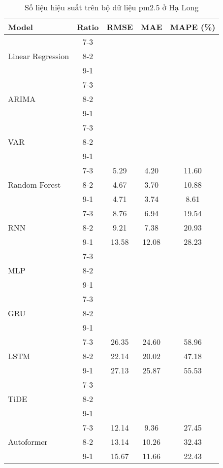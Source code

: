 \begin{table}[h!]
    \centering
    \caption{Số liệu hiệu suất trên bộ dữ liệu pm2.5 ở Hạ Long}
    \begin{tabular}{|l|c|c|c|c|}
    \hline
    \rowcolor{orange!30} \textbf{Model} & \textbf{Ratio} & \textbf{RMSE} & \textbf{MAE} & \textbf{MAPE (\%)} \\ \hline
    \rowcolor{white} & 7-3 &  &  &  \\ 
    \rowcolor{white} Linear Regression & 8-2 &  &  &  \\ 
    \rowcolor{white} & 9-1 &  &  &  \\ \hline
    \rowcolor{white} & 7-3 &  &  &  \\ 
    \rowcolor{white} ARIMA & 8-2 &  &  &  \\ 
    \rowcolor{white} & 9-1 &  &  &  \\ \hline
    \rowcolor{white} & 7-3 &  &  &  \\ 
    \rowcolor{white} VAR & 8-2 &  &  &  \\ 
    \rowcolor{white} & 9-1 &  &  & \\ \hline
    \rowcolor{white} & 7-3 & 5.29 & 4.20 & 11.60 \\ 
    \rowcolor{white} Random Forest & 8-2 & 4.67 & 3.70 & 10.88 \\ 
    \rowcolor{white} & 9-1 & 4.71 & 3.74 & 8.61 \\ \hline
    \rowcolor{white}  & 7-3 & 8.76 & 6.94 & 19.54 \\ 
    \rowcolor{white} RNN & 8-2 & 9.21 & 7.38 & 20.93 \\ 
    \rowcolor{white}  & 9-1 & 13.58 & 12.08 & 28.23 \\ \hline
    \rowcolor{white} & 7-3 &  &  &  \\ 
    \rowcolor{white} MLP & 8-2 &  &  &  \\ 
    \rowcolor{white} & 9-1 &  &  &  \\ \hline
    \rowcolor{white} & 7-3 &  &  &  \\ 
    \rowcolor{white} GRU & 8-2 &  &  &  \\ 
    \rowcolor{white} & 9-1 &  &  &  \\ \hline
    \rowcolor{white}  & 7-3 & 26.35 & 24.60 & 58.96 \\ 
    \rowcolor{white} LSTM & 8-2 & 22.14 & 20.02 & 47.18 \\ 
    \rowcolor{white}  & 9-1 & 27.13 & 25.87 & 55.53 \\ \hline
    \rowcolor{white!30} & 7-3 &  &  &  \\ 
    \rowcolor{white!30} TiDE & 8-2 &  &  &  \\ 
    \rowcolor{white!30} & 9-1 &  &  &  \\ \hline
    \rowcolor{white}  & 7-3 & 12.14 & 9.36 & 27.45 \\ 
    \rowcolor{white}  Autoformer & 8-2 & 13.14 & 10.26 & 32.43 \\ 
    \rowcolor{white}  & 9-1 & 15.67 & 11.66 & 22.43 \\ \hline

    \end{tabular}
\end{table}